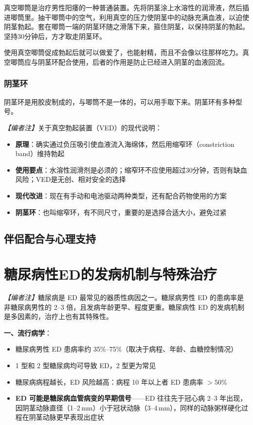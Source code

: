 真空唧筒是治疗男性阳痿的一种普通装置。先将阴茎涂上水溶性的润滑液，然后插进唧筒里。抽干唧筒中的空气，利用真空的压力使阴茎中的动脉充满血液，以迫使阴茎勃起。套在唧筒一端的阴茎环随之滑落下来，箍住阴茎，以保持阴茎的勃起。坚持30分钟后，方才取走阴茎环。

使用真空唧筒促成勃起后就可以做爱了，也能射精，而且不会像以往那样吃力。真空唧筒应与阴茎环配合使用，后者的作用是防止已经进入阴茎的血液回流。

\subsubsection{阴茎环}

阴茎环是用胶皮制成的，与唧筒不是一体的，可以用手取下来。阴茎环有多种型号。

\noindent\textit{【编者注】}关于真空勃起装置（VED）的现代说明：
\begin{itemize}
	\item \textbf{原理}：确实通过负压吸引使血液流入海绵体，然后用缩窄环（constriction band）维持勃起
	\item \textbf{使用要点}：水溶性润滑剂是必须的；缩窄环不应使用超过30分钟，否则有缺血风险；VED是无创、相对安全的选择
	\item \textbf{现代改进}：现在有手动和电池驱动两种类型，还有配合药物使用的方案
	\item \textbf{阴茎环}：也叫缩窄环，有不同尺寸，重要的是选择合适大小，避免过紧
\end{itemize}
\subsection{伴侣配合与心理支持}

\section{糖尿病性ED的发病机制与特殊治疗}
\label{sec:diabetic_ed}

\noindent\textit{【编者注】}糖尿病是 ED 最常见的器质性病因之一。糖尿病男性 ED 的患病率是非糖尿病男性的 2--3 倍，且发病年龄更早、程度更重。糖尿病性 ED 的发病机制是多因素的，治疗上也有其特殊性。

\vspace{0.5em}
\noindent\textbf{一、流行病学}：

\begin{itemize}[leftmargin=2cm]
	\item 糖尿病男性 ED 患病率约 35\%--75\%（取决于病程、年龄、血糖控制情况）
	\item 1 型和 2 型糖尿病均可导致 ED，2 型更为常见
	\item 糖尿病病程越长，ED 风险越高：病程 10 年以上者 ED 患病率 $>50\%$
	\item \textbf{ED 可能是糖尿病血管病变的早期信号}——ED 往往先于冠心病 2--3 年出现，因阴茎动脉直径（1--2\,mm）小于冠状动脉（3--4\,mm），同样的动脉粥样硬化过程在阴茎动脉更早表现出症状
\end{itemize}

